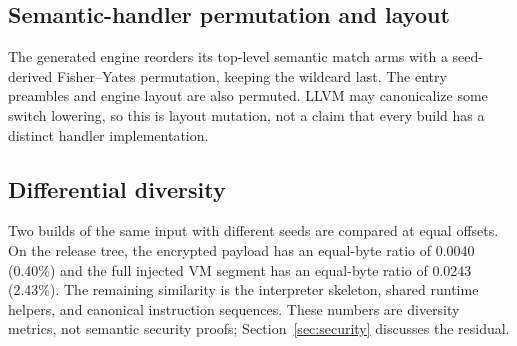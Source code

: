 \subsection{Semantic-handler permutation and layout}

The generated engine reorders its top-level semantic match arms with a
seed-derived Fisher--Yates permutation, keeping the wildcard last. The entry
preambles and engine layout are also permuted. LLVM may canonicalize some switch
lowering, so this is layout mutation, not a claim that every build has a distinct
handler implementation.

\subsection{Differential diversity}

Two builds of the same input with different seeds are compared at equal offsets.
On the release tree, the encrypted payload has an equal-byte ratio of 0.0040
(0.40\%) and the full injected VM segment has an equal-byte ratio of 0.0243
(2.43\%). The remaining similarity is the interpreter skeleton, shared runtime
helpers, and canonical instruction sequences. These numbers are diversity
metrics, not semantic security proofs; Section~\ref{sec:security} discusses the
residual.
